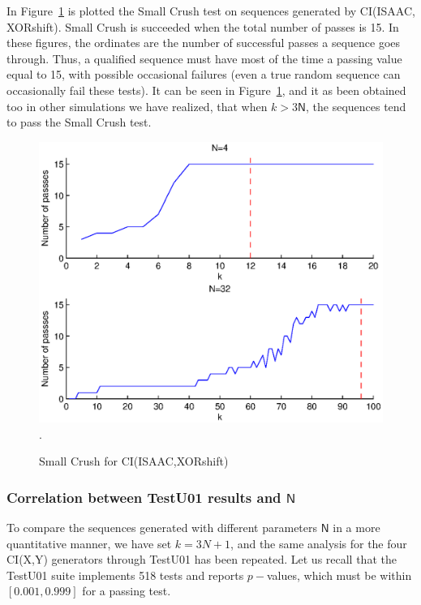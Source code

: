 In Figure~\ref{Small Crush for CI} is plotted the Small Crush test on sequences generated by CI(ISAAC, XORshift). 
Small Crush is succeeded when the total number of passes is 15. 
In these figures, the ordinates are the number of successful passes a sequence goes through. 
Thus, a qualified sequence must have most of the time a passing value equal to 15, with possible occasional failures (even a true random sequence can occasionally fail these tests). 
It can be seen in Figure~\ref{Small Crush for CI}, and it as been obtained too in other simulations we have realized, that when $k>3\mathsf{N}$, the sequences tend to pass the Small Crush test. 

\begin{figure}
\centering
\includegraphics[scale=0.55]{images/correlation_c_sc.eps} 
\DeclareGraphicsExtensions.
\caption{Small Crush for CI(ISAAC,XORshift)}
\label{Small Crush for CI}
\end{figure}

\subsubsection{Correlation between TestU01 results and $\mathsf{N}$}

To compare the sequences generated with different parameters $\mathsf{N}$ in a more quantitative manner, we have set $k=3N+1$, and the same analysis for the four CI(X,Y) generators through TestU01 has been repeated. Let us recall that the TestU01 suite implements 518 tests and reports $p-$values, which must be within $[0.001,0.999]$ for a passing test.

